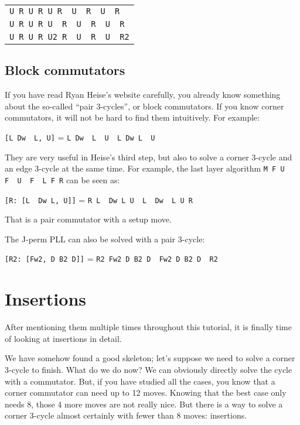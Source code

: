 \documentclass[11pt,a4paper]{book}
\newcommand{\p}{\textquotesingle}
\newcommand{\m}{\texttt}
\newcommand{\ps}{\p\,\,}
\begin{document}
\begin{center}
\begin{tabular}{l}
\m{U R U R U R\ps U\ps R\ps U\ps R\p}\\
\m{U R U R U\ps R\ps U\ps R\ps U\ps R}\\
\m{U R U R U2 R\ps U\ps R\ps U\ps R2}
\end{tabular}
\end{center}

\subsection{Block commutators}

If you have read Ryan Heise's website carefully, you already know something about the so-called ``pair 3-cycles'', or block commutators. If you know corner commutators, it will not be hard to find them intuitively. For example:

\begin{center}
\m{[L Dw\ps L\p, U\p]} = \m{L Dw\ps L\ps U\ps L Dw L\ps U}
\end{center}

They are very useful in Heise's third step, but also to solve a corner 3-cycle and an edge 3-cycle at the same time. For example, the last layer algorithm \m{M F U F\ps U\ps F\ps L F R\p} can be seen as:

\begin{center}
\m{[R: [L\ps Dw L, U\p]]} = \m{R L\ps Dw L U\ps L\ps Dw\ps L U R\p}
\end{center}

That is a pair commutator with a setup move.

The J-perm PLL can also be solved with a pair 3-cycle:

\begin{center}
\m{[R2: [Fw2, D B2 D\p]]} = \m{R2 Fw2 D B2 D\ps Fw2 D B2 D\ps R2}
\end{center}

\section{Insertions}

After mentioning them multiple times throughout this tutorial, it is finally time of looking at insertions in detail.

We have somehow found a good skeleton; let's suppose we need to solve a corner 3-cycle to finish. What do we do now? We can obviously directly solve the cycle with a commutator. But, if you have studied all the cases, you know that a corner commutator can need up to 12 moves. Knowing that the best case only needs 8, those 4 more moves are not really nice. But there is a way to solve a corner 3-cycle almost certainly with fewer than 8 moves: insertions.
\end{document}
